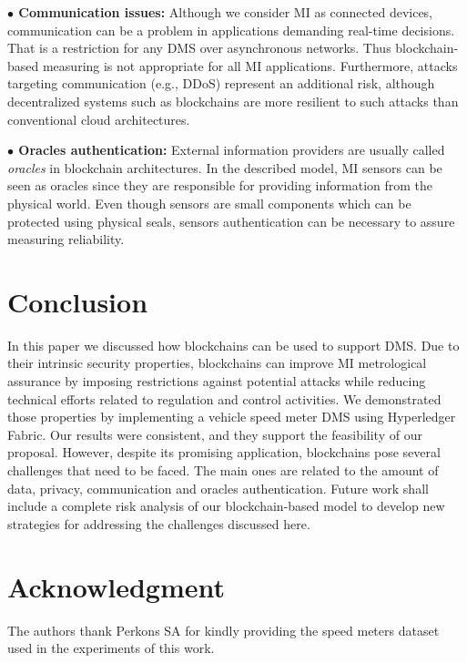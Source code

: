 \documentclass[journal]{IEEEtran}
\begin{document}
\textbf{$\bullet$ Communication issues:} Although we consider MI as connected devices, communication can be a problem in applications demanding real-time decisions. 
That is a restriction for any DMS over asynchronous networks. 
Thus blockchain-based measuring is not appropriate for all MI applications. 
Furthermore, attacks targeting communication (e.g., DDoS) represent an additional risk, although decentralized systems such as blockchains are more resilient to such attacks than conventional cloud architectures.

\textbf{$\bullet$ Oracles authentication:} External information providers are usually called \emph{oracles} in blockchain architectures. 
In the described model, MI sensors can be seen as oracles since they are responsible for providing information from the physical world. 
Even though sensors are small components which can be protected using physical seals, sensors authentication can be necessary to assure measuring reliability.

\section{Conclusion}
In this paper we discussed how blockchains can be used to support DMS.
Due to their intrinsic security properties, blockchains can improve MI metrological assurance by imposing restrictions against potential attacks while reducing technical efforts related to regulation and control activities.
We demonstrated those properties by implementing a vehicle speed meter DMS using Hyperledger Fabric.
Our results were consistent, and they support the feasibility of our proposal. 
However, despite its promising application, blockchains pose several challenges that need to be faced. 
The main ones are related to the amount of data, privacy, communication and oracles authentication. 
Future work shall include a complete risk analysis of our blockchain-based model to develop new strategies for addressing the challenges discussed here.


\section*{Acknowledgment}
The authors thank Perkons SA for kindly providing the speed meters dataset used in the experiments of this work.
\end{document}
